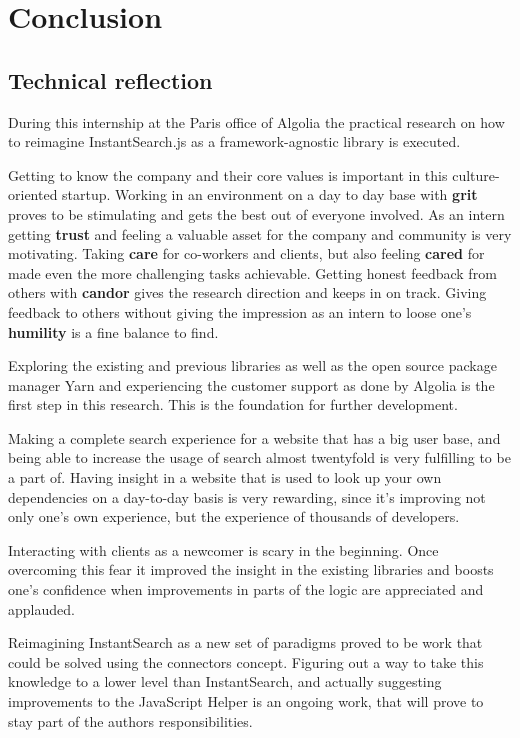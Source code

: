 
\chapter{Conclusion} %
\label{chp:conclusion}

\section{Technical reflection}

During this internship at the Paris office of Algolia the practical research on how to reimagine InstantSearch.js as a framework-agnostic library is executed.

Getting to know the company and their core values is important in this culture-oriented startup. Working in an environment on a day to day base with \textbf{grit} proves to be stimulating and gets the best out of everyone involved. As an intern getting \textbf{trust} and feeling a valuable asset for the company and community is very motivating. Taking \textbf{care} for co-workers and clients, but also feeling \textbf{cared} for made even the more challenging tasks achievable. Getting honest feedback from others with \textbf{candor} gives the research direction and keeps in on track. Giving feedback to others without giving the impression as an intern to loose one's \textbf{humility} is a fine balance to find.

Exploring the existing and previous libraries as well as the open source package manager Yarn and experiencing the customer support as done by Algolia is the first step in this research. This is the foundation for further development.

Making a complete search experience for a website that has a big user base, and being able to increase the usage of search almost twentyfold is very fulfilling to be a part of. Having insight in a website that is used to look up your own dependencies on a day-to-day basis is very rewarding, since it's improving not only one's own experience, but the experience of thousands of developers.

Interacting with clients as a newcomer is scary in the beginning. Once overcoming this fear it improved the insight in the existing libraries and boosts one's confidence when improvements in parts of the logic are appreciated and applauded.

Reimagining InstantSearch as a new set of paradigms proved to be work that could be solved using the connectors concept. Figuring out a way to take this knowledge to a lower level than InstantSearch, and actually suggesting improvements to the JavaScript Helper is an ongoing work, that will prove to stay part of the authors responsibilities.

